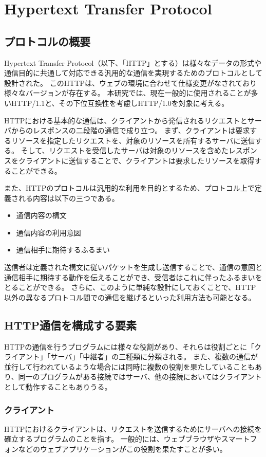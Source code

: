 \documentclass[12pt,a4paper]{jbook}
\begin{document}
\section{Hypertext Transfer Protocol}
\label{sec:http}
\subsection{プロトコルの概要}
Hypertext Transfer Protocol（以下、「HTTP」とする）は様々なデータの形式や通信目的に共通して対応できる汎用的な通信を実現するためのプロトコルとして設計された。
このHTTPは、ウェブの環境に合わせて仕様変更がなされており様々なバージョンが存在する。
本研究では、現在一般的に使用されることが多いHTTP/1.1\cite{rfc7230,rfc7231,rfc7232,rfc7233,rfc7234,rfc7235}と、その下位互換性を考慮しHTTP/1.0\cite{rfc1945}を対象に考える。

HTTPにおける基本的な通信は、クライアントから発信されるリクエストとサーバからのレスポンスの二段階の通信で成り立つ。
まず、クライアントは要求するリソースを指定したリクエストを、対象のリソースを所有するサーバに送信する。
そして、リクエストを受信したサーバは対象のリソースを含めたレスポンスをクライアントに送信することで、クライアントは要求したリソースを取得することができる。

また、HTTPのプロトコルは汎用的な利用を目的とするため、プロトコル上で定義される内容は以下の三つである。
\begin{itemize}
\item 通信内容の構文
\item 通信内容の利用意図
\item 通信相手に期待するふるまい
\end{itemize}
送信者は定義された構文に従いパケットを生成し送信することで、通信の意図と通信相手に期待する動作を伝えることができ、受信者はこれに伴ったふるまいをとることができる。
さらに、このように単純な設計にしておくことで、HTTP以外の異なるプロトコル間での通信を継げるといった利用方法も可能となる。

\subsection{HTTP通信を構成する要素}
HTTPの通信を行うプログラムには様々な役割があり、それらは役割ごとに「クライアント」「サーバ」「中継者」の三種類に分類される。
また、複数の通信が並行して行われているような場合には同時に複数の役割を果たしていることもあり、同一のプログラムがある接続ではサーバ、他の接続においてはクライアントとして動作することもありうる。

\subsubsection{クライアント}
HTTPにおけるクライアントは、リクエストを送信するためにサーバへの接続を確立するプログラムのことを指す。
一般的には、ウェブブラウザやスマートフォンなどのウェブアプリケーションがこの役割を果たすことが多い。
\end{document}
